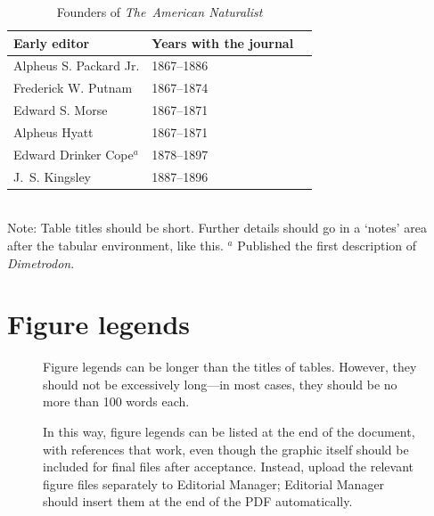 \documentclass[11pt]{article}
\begin{document}
\begin{table}[h]
\caption{Founders of \textit{The~American Naturalist}}
\label{Table:Founders}
\centering
\begin{tabular}{lll}\hline
Early editor            & Years with the journal \\ \hline
Alpheus S. Packard Jr.  & 1867--1886 \\
Frederick W. Putnam     & 1867--1874 \\ 
Edward S. Morse         & 1867--1871 \\ 
Alpheus Hyatt           & 1867--1871 \\
Edward Drinker Cope$^a$ & 1878--1897 \\
J.~S. Kingsley          & 1887--1896 \\ \hline 
\end{tabular}
\bigskip{}
\\
{\footnotesize Note: Table titles should be short. Further details should go in a `notes' area after the tabular environment, like this. $^a$ Published the first description of \textit{Dimetrodon}.}
\end{table}

\newpage{}

\section*{Figure legends}

\begin{figure}[h!]
\caption{Figure legends can be longer than the titles of tables. However, they should not be excessively long---in most cases, they should be no more than 100 words each.}
\label{Fig:OkapiHorn}
\end{figure}



\begin{figure}[h!]
\caption{In this way, figure legends can be listed at the end of the document, with references that work, even though the graphic itself should be included for final files after acceptance. Instead, upload the relevant figure files separately to Editorial Manager; Editorial Manager should insert them at the end of the PDF automatically.}
\label{Fig:AnotherFigure}
\end{figure}


\renewcommand{\thefigure}{A\arabic{figure}}
\setcounter{figure}{0}
\end{document}
